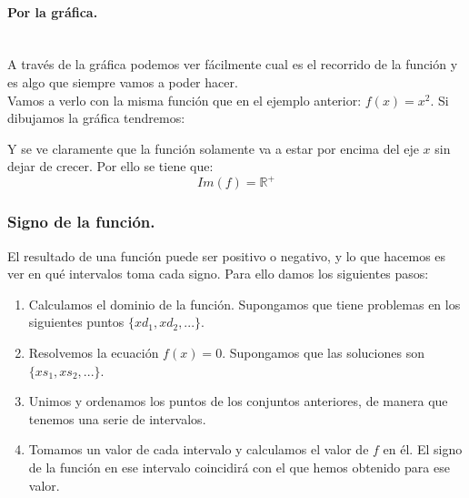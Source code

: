 \documentclass[a4paper,11pt,answers]{exam}
\begin{document}
\paragraph{Por la gráfica.}\mbox{}\\
A través de la gráfica podemos ver fácilmente cual es el recorrido de la función y es algo que siempre vamos a poder hacer.\\
Vamos a verlo con la misma función que en el ejemplo anterior: $f(x) = x^2$. Si dibujamos la gráfica tendremos:\\
\begin{center}
\end{center}
Y se ve claramente que la función solamente va a estar por encima del eje $x$ sin dejar de crecer. Por ello se tiene que:
\[Im(f) = \mathbb{R}^+\]

\subsubsection{Signo de la función.}
El resultado de una función puede ser positivo o negativo, y lo que hacemos es ver en qué intervalos toma cada signo. Para ello damos los siguientes pasos:
\begin{enumerate}
	\item Calculamos el dominio de la función. Supongamos que tiene problemas en los siguientes puntos $\{xd_1, xd_2, ...\}$.
	\item Resolvemos la ecuación $f(x) = 0$. Supongamos que las soluciones son $\{xs_1, xs_2, ...\}$.
	\item Unimos y ordenamos los puntos de los conjuntos anteriores, de manera que tenemos una serie de intervalos.
	\item Tomamos un valor de cada intervalo y calculamos el valor de $f$ en él. El signo de la función en ese intervalo coincidirá con  el que hemos obtenido para ese valor.
\end{enumerate}
\end{document}
